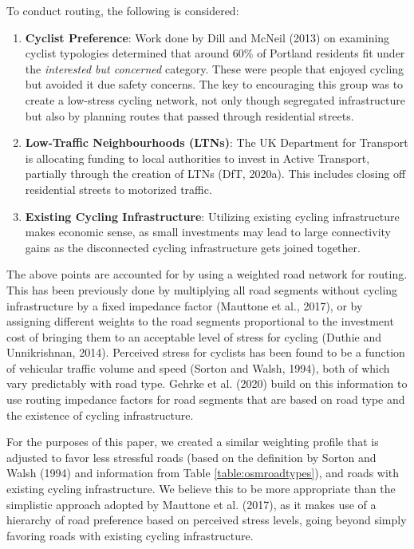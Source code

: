 \documentclass[
]{article}
\providecommand{\tightlist}{%
  \setlength{\itemsep}{0pt}\setlength{\parskip}{0pt}}
\begin{document}
To conduct routing, the following is considered:

\begin{enumerate}
\def\labelenumi{\arabic{enumi}.}
\tightlist
\item
  \textbf{Cyclist Preference}: Work done by Dill and McNeil (2013) on examining
  cyclist typologies determined that around 60\% of Portland residents
  fit under the \emph{interested but concerned} category. These were people
  that enjoyed cycling but avoided it due safety concerns. The key to
  encouraging this group was to create a low-stress cycling network,
  not only though segregated infrastructure but also by planning
  routes that passed through residential streets.
\item
  \textbf{Low-Traffic Neighbourhoods (LTNs)}: The UK Department for Transport is
  allocating funding to local authorities to invest in Active
  Transport, partially through the creation of LTNs
  (DfT, 2020a). This includes closing off residential
  streets to motorized traffic.
\item
  \textbf{Existing Cycling Infrastructure}: Utilizing existing cycling
  infrastructure makes economic sense, as small investments may lead
  to large connectivity gains as the disconnected cycling
  infrastructure gets joined together.
\end{enumerate}

The above points are accounted for by using a weighted road network for
routing. This has been previously done by multiplying all road segments
without cycling infrastructure by a fixed impedance factor
(Mauttone et al., 2017), or by assigning different weights to the road
segments proportional to the investment cost of bringing them to an
acceptable level of stress for cycling (Duthie and Unnikrishnan, 2014).
Perceived stress for cyclists has been found to be a function of vehicular traffic
volume and speed (Sorton and Walsh, 1994), both of which vary predictably
with road type. Gehrke et al. (2020) build on this information to use
routing impedance factors for road segments that are based on road type
and the existence of cycling infrastructure.

For the purposes of this paper, we created a similar weighting profile
that is adjusted to favor less stressful roads (based on the definition
by Sorton and Walsh (1994) and information from Table
\ref{table:osmroadtypes}), and roads with existing cycling
infrastructure. We believe this to be more appropriate than the simplistic
approach adopted by Mauttone et al. (2017), as it makes use of a hierarchy
of road preference based on perceived stress levels, going beyond simply
favoring roads with existing cycling infrastructure.
\end{document}
